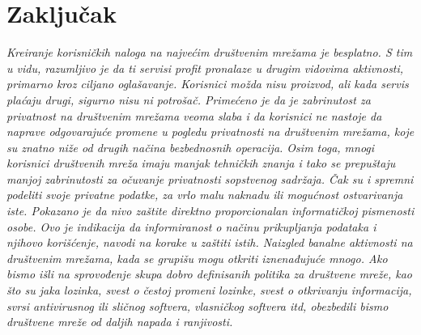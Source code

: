 \documentclass[a4paper]{article}
\begin{document}
\section{Zaključak}
\textit{Kreiranje korisničkih naloga na najvećim društvenim mrežama je besplatno. S tim u vidu, razumljivo je da ti servisi profit pronalaze u drugim vidovima aktivnosti, primarno kroz ciljano oglašavanje. Korisnici možda nisu proizvod, ali kada servis plaćaju drugi, sigurno nisu ni potrošač. Primećeno je da je zabrinutost za privatnost na društvenim mrežama veoma slaba i da korisnici ne nastoje da naprave odgovarajuće promene u pogledu privatnosti na društvenim mrežama, koje su znatno niže od drugih načina bezbednosnih operacija. Osim toga, mnogi korisnici društvenih mreža imaju manjak tehničkih znanja i tako se prepuštaju manjoj zabrinutosti za očuvanje privatnosti sopstvenog sadržaja. Čak su i spremni podeliti svoje privatne podatke, za vrlo malu naknadu ili mogućnost ostvarivanja iste. Pokazano je da nivo zaštite direktno proporcionalan informatičkoj pismenosti osobe. Ovo je indikacija da informiranost o načinu prikupljanja podataka i njihovo korišćenje, navodi na korake u zaštiti istih. Naizgled banalne aktivnosti na društvenim mrežama, kada se grupišu mogu otkriti iznenađujuće mnogo. Ako bismo išli na sprovođenje skupa dobro definisanih politika za društvene mreže, kao što su jaka lozinka, svest o čestoj promeni  lozinke, svest o otkrivanju informacija, svrsi  antivirusnog ili  sličnog softvera, vlasničkog softvera itd, obezbedili bismo društvene mreže od daljih napada i ranjivosti.}
\newpage


\appendix

\iffalse
 

\fi
\end{document}
